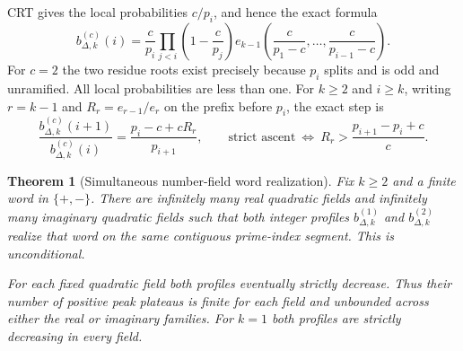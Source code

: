 \documentclass[11pt]{article}
\newtheorem{theorem}{Theorem}[section]
\begin{document}
CRT gives the local probabilities \(c/p_i\), and hence the exact formula
\[
 b_{\Delta,k}^{(c)}(i)=\frac c{p_i}
       \prod_{j<i}\left(1-\frac c{p_j}\right)
       e_{k-1}\left(\frac c{p_1-c},\ldots,\frac c{p_{i-1}-c}\right).
                                                               \tag{26}
\]
For \(c=2\) the two residue roots exist precisely because \(p_i\)
splits and is odd and unramified. All local probabilities are less
than one. For \(k\geq2\) and \(i\geq k\), writing \(r=k-1\) and
\(R_r=e_{r-1}/e_r\) on the prefix before \(p_i\), the exact step is
\[
 \frac{b_{\Delta,k}^{(c)}(i+1)}{b_{\Delta,k}^{(c)}(i)}
       =\frac{p_i-c+cR_r}{p_{i+1}},\qquad
 \text{strict ascent}\ \Longleftrightarrow\
       R_r>\frac{p_{i+1}-p_i+c}{c}.                 \tag{27}
\]

\begin{theorem}[Simultaneous number-field word realization]
\label{thm:numberFieldWords}
Fix \(k\geq2\) and a finite word in \(\{+,-\}\).
There are infinitely many real quadratic fields and infinitely many
imaginary quadratic fields such that both integer profiles
\(b_{\Delta,k}^{(1)}\) and \(b_{\Delta,k}^{(2)}\) realize that word
on the same contiguous prime-index segment. This is unconditional.

For each fixed quadratic field both profiles eventually strictly
decrease. Thus their number of positive peak plateaus is finite for
each field and unbounded across either the real or imaginary families.
For \(k=1\) both profiles are strictly decreasing in every field.
\end{theorem}
\end{document}
